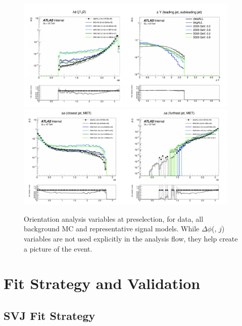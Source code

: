 \begin{figure}[!htbp]
\centering
    \includegraphics[width=0.95\textwidth]{figures/eventsel/preselection/presel3}
    \includegraphics[width=0.95\textwidth]{figures/eventsel/preselection/presel4}
     \caption{Orientation analysis variables at preselection, for data, all background MC and representative signal models. While $\Delta\phi$(\met, $j$) variables are not used explicitly in the analysis flow, they help create a picture of the event.
    \label{fig:presel_vars2}}
\end{figure}

%


\section{Fit Strategy and Validation}
\label{sec:fit_strategy}
\subsection{SVJ Fit Strategy}
\label{subsec:fit_exclusion}

%
%

